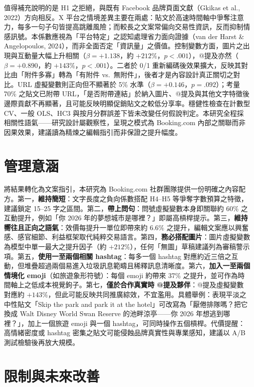 \documentclass[12pt,a4paper]{ctexart}
\begin{document}
值得補充說明的是 H1 之拒絕，與既有 Facebook 品牌頁面文獻（Gkikas et al., 2022）方向相反。X 平台之情境差異主要在兩處：貼文於高速時間軸中爭奪注意力，每多一句子句皆提高跳離風險；而較長之文案常偏向交易性資訊，反而抑制情感訊號。本係數應視為「平台特定」之認知處理省力面向證據（van der Harst \& Angelopoulos, 2024），而非全面否定「資訊量」之價值。控制變數方面，圖片之出現與互動量大幅上升相關（$\beta=+1.138$，約 $+212\%$，$p<.001$），@提及亦然（$\beta=+0.890$，約 $+143\%$，$p<.001$）。二者於 0/1 重新編碼後效果擴大，反映其對比由「附件多寡」轉為「有附件 vs.\ 無附件」，後者才是內容設計真正關切之對比。URL 虛擬變數則正向但不顯著於 5\% 水準（$\beta=+0.146$，$p=.092$）；考量 70\% 之貼文已附帶 URL，「是否附帶連結」於納入圖片、@提及與其他文字特徵後邊際貢獻不再顯著，且可能反映明顯促銷貼文之較低分享率。穩健性檢查在計數型 CV、一般 OLS、HC3 與按月分群誤差下皆未改變任何假說判定。本研究全程採相關性語氣——研究設計屬觀察性，呈現之模式為 Booking.com 內部之關聯而非因果效果，建議讀為精煉之編輯指引而非保證之提升幅度。

\section{管理意涵}

將結果轉化為文案指引，本研究為 Booking.com 社群團隊提供一份明確之內容配方。第一，\textbf{維持簡短}：文字長度之負向係數搭配 H4--H5 等爭奪字數預算之特徵，建議鎖定 15--25 字之區間。第二，\textbf{帶上問句}：問號虛擬變數本身即關聯約 60\% 之互動提升，例如「你 2026 年的夢想城市是哪裡？」即屬高槓桿提示。第三，\textbf{維持嚮往且正向之語氣}：效價每提升一單位即帶來約 6.6\% 之提升，編輯文案應以興奮感、感官細節、利益框架取代純粹交易語言。第四，\textbf{務必搭配圖片}：圖片虛擬變數為模型中單一最大之提升因子（約 $+212\%$），任何「無圖」草稿建議列為審稿警示項。第五，\textbf{使用一至兩個相關 hashtag}：每多一個 hashtag 對應約近三倍之互動，但堆疊超過兩個易進入垃圾訊息範疇且稀釋訊息清晰度。第六，\textbf{加入一至兩個情境化 emoji}（如旅遊象形符號）：每個 emoji 約帶來 37\% 之提升，並可作為時間軸上之低成本視覺鉤子。第七，\textbf{僅於合作真實時 @提及夥伴}：@提及虛擬變數對應約 $+143\%$，但此可能反映共同推廣綜效，不宜濫用。具體舉例：表現平淡之中性貼文「Skip the park and park it at the hotel」可改寫為「厭倦排隊嗎？把它換成 Walt Disney World Swan Reserve 的池畔涼亭——你 2026 年想逃到哪裡？」，加上一個旅遊 emoji 與一個 hashtag，可同時操作五個槓桿。代價提醒：高情緒密度或 hashtag 密集之貼文可能侵蝕品牌真實性與專業感知，建議以 A/B 測試檢驗後再放大規模。

\section{限制與未來改善}
\end{document}
